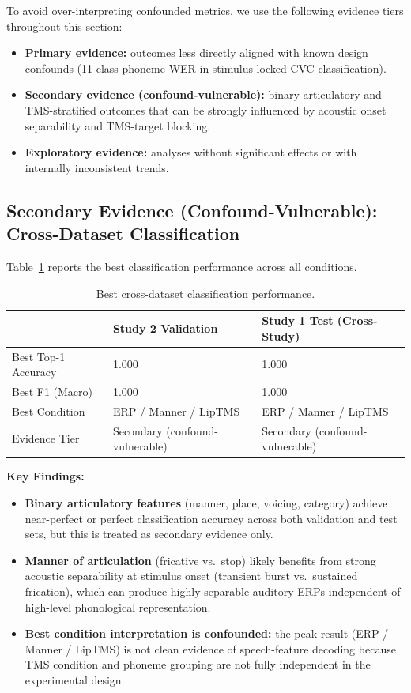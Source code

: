 \documentclass[11pt,a4paper]{article}
\begin{document}
To avoid over-interpreting confounded metrics, we use the following evidence
tiers throughout this section:

\begin{itemize}
  \item \textbf{Primary evidence:} outcomes less directly aligned with known
    design confounds (11-class phoneme WER in stimulus-locked CVC
    classification).
  \item \textbf{Secondary evidence (confound-vulnerable):} binary articulatory
    and TMS-stratified outcomes that can be strongly influenced by acoustic
    onset separability and TMS-target blocking.
  \item \textbf{Exploratory evidence:} analyses without significant effects or
    with internally inconsistent trends.
\end{itemize}

\subsection{Secondary Evidence (Confound-Vulnerable): Cross-Dataset Classification}

Table~\ref{tab:cross_dataset} reports the best classification performance across
all conditions.

\begin{table}[H]
\centering
\caption{Best cross-dataset classification performance.}
\label{tab:cross_dataset}
\begin{tabular}{lll}
\toprule
 & \textbf{Study 2 Validation} & \textbf{Study 1 Test (Cross-Study)} \\
\midrule
Best Top-1 Accuracy & 1.000 & 1.000 \\
Best F1 (Macro)     & 1.000 & 1.000 \\
Best Condition      & ERP / Manner / LipTMS & ERP / Manner / LipTMS \\
Evidence Tier       & Secondary (confound-vulnerable) & Secondary (confound-vulnerable) \\
\bottomrule
\end{tabular}
\end{table}

\textbf{Key Findings:}
\begin{itemize}
  \item \textbf{Binary articulatory features} (manner, place, voicing,
    category) achieve near-perfect or perfect classification accuracy across
    both validation and test sets, but this is treated as secondary evidence
    only.
  \item \textbf{Manner of articulation} (fricative vs.\ stop) likely benefits
    from strong acoustic separability at stimulus onset (transient burst
    vs.\ sustained frication), which can produce highly separable auditory ERPs
    independent of high-level phonological representation.
  \item \textbf{Best condition interpretation is confounded:} the peak result
    (ERP / Manner / LipTMS) is not clean evidence of speech-feature decoding
    because TMS condition and phoneme grouping are not fully independent in the
    experimental design.
\end{itemize}
\end{document}
